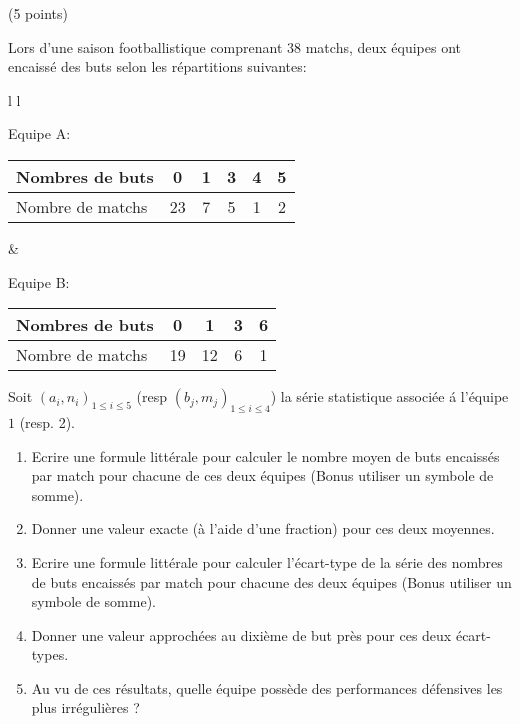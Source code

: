 \documentclass[a4paper,11pt]{article}
\theoremstyle{break}
\begin{document}
\begin{exo}(5 points)
      
Lors d'une saison footballistique comprenant 38 matchs, deux équipes
ont encaissé des buts selon les répartitions suivantes:

\begin{center}

\begin{tabular}{l l}
 
 Equipe A: 

\begin{tabular}{|l|c|c|c|c|c|}
  \hline
  Nombres de buts  & 0  & 1 &3 & 4 & 5 \\
  \hline
  Nombre de matchs & 23 & 7 &5 & 1 &2 \\
  
  \hline
\end{tabular}

 &

 Equipe B:

\begin{tabular}{|l|c|c|c|c|}
  \hline
  Nombres de buts  & 0  & 1 &3 & 6 \\
  \hline
  Nombre de matchs & 19 & 12 &6 & 1  \\
  
  \hline
\end{tabular}

 \end{tabular}

\end{center} 
\vspace{0.5cm}
Soit $(a_i,n_i)_{1 \leq i \leq 5}$ (resp $(b_j,m_j)_{1 \leq i \leq 4}$) la s\'erie statistique
associ\'ee \'a l'\'equipe $1$ (resp. 2).
\begin{enumerate}
 \item Ecrire une formule littérale pour calculer le nombre moyen de buts
  encaissés par match pour chacune de ces deux équipes (Bonus utiliser un symbole de somme).
  \item Donner une valeur exacte (à l'aide d'une fraction) pour ces deux moyennes.
  \item Ecrire une formule littérale pour calculer l'écart-type de la série
  des nombres de buts encaissés par match pour chacune des deux équipes 
  (Bonus utiliser un symbole de somme).
  \item Donner une valeur approchées au dixième de but près pour ces deux écart-types.
  \item Au vu de ces résultats, quelle équipe possède des performances défensives les plus 
  irrégulières ?
\end{enumerate}


\end{exo}
\end{document}
